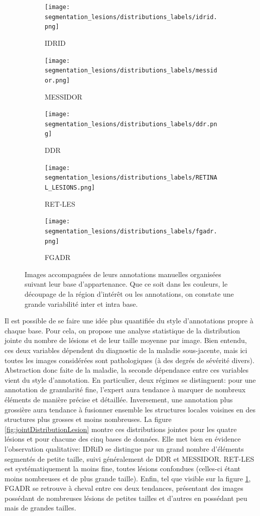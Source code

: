\newcommand{\colSize}{0.19}
\begin{figure}
	\centering
	\begin{subfigure}{\colSize\textwidth}
		\texttt{[image: segmentation\_lesions/distributions\_labels/idrid.png]}
		\caption{IDRID}
	\end{subfigure}
\begin{subfigure}{\colSize\textwidth}
	\texttt{[image: segmentation\_lesions/distributions\_labels/messidor.png]}
	\caption{MESSIDOR}
\end{subfigure}
\begin{subfigure}{\colSize\textwidth}
	\texttt{[image: segmentation\_lesions/distributions\_labels/ddr.png]}
	\caption{DDR}
\end{subfigure}
\begin{subfigure}{\colSize\textwidth}
	\texttt{[image: segmentation\_lesions/distributions\_labels/RETINAL\_LESIONS.png]}
	\caption{RET-LES}
\end{subfigure}
\begin{subfigure}{\colSize\textwidth}
	\texttt{[image: segmentation\_lesions/distributions\_labels/fgadr.png]}
	\caption{FGADR}
\end{subfigure}
\caption{Images accompagnées de leurs annotations manuelles organisées suivant leur base d'appartenance. Que ce soit dans les couleurs, le découpage de la région d'intérêt ou les annotations, on constate une grande variabilité inter et intra base.}
\label{fig:annotationsManuellesBases}
\end{figure}
Il est possible de se faire une idée plus quantifiée du style d'annotations propre à chaque base. Pour cela, on propose une analyse statistique de la distribution jointe du nombre de lésions et de leur taille moyenne par image. Bien entendu, ces deux variables dépendent du diagnostic de la maladie sous-jacente, mais ici toutes les images considérées sont pathologiques (à des degrés de sévérité divers). Abstraction donc faite de la maladie, la seconde dépendance entre ces variables vient du style d'annotation. En particulier, deux régimes se distinguent: pour une annotation de granularité fine, l'expert aura tendance à marquer de nombreux éléments de manière précise et détaillée. Inversement, une annotation plus grossière aura tendance à fusionner ensemble les structures locales voisines en des structures plus grosses et moins nombreuses. La figure \ref{fig:jointDistributionLesion} montre ces distributions jointes pour les quatre lésions et pour chacune des cinq bases de données. Elle met bien en évidence l'observation qualitative: \ac{IDRiD} se distingue par un grand nombre d'éléments segmentés de petite taille, suivi généralement de \ac{DDR} et MESSIDOR. RET-LES est systématiquement la moins fine, toutes lésions confondues (celles-ci étant moins nombreuses et de plus grande taille). Enfin, tel que visible sur la figure \ref{fig:annotationsManuellesBases}, FGADR se retrouve à cheval entre ces deux tendances, présentant des images possédant de nombreuses lésions de petites tailles et d'autres en possédant peu mais de grandes tailles. 


